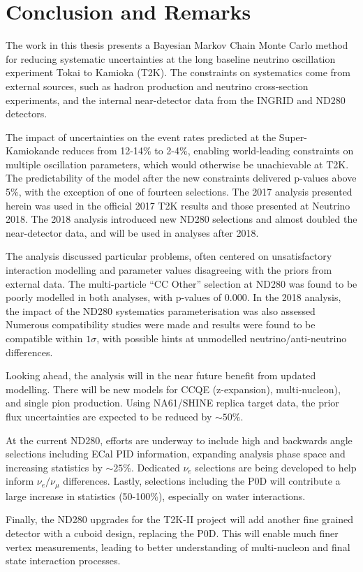 \chapter{Conclusion and Remarks}
\label{chap:conclusion}
The work in this thesis presents a Bayesian Markov Chain Monte Carlo method for reducing systematic uncertainties at the long baseline neutrino oscillation experiment Tokai to Kamioka (T2K). The constraints on systematics come from external sources, such as hadron production and neutrino cross-section experiments, and the internal near-detector data from the INGRID and ND280 detectors.

The impact of uncertainties on the event rates predicted at the Super-Kamiokande reduces from 12-14\% to 2-4\%, enabling world-leading constraints on multiple oscillation parameters, which would otherwise be unachievable at T2K. The predictability of the model after the new constraints delivered p-values above 5\%, with the exception of one of fourteen selections. The 2017 analysis presented herein was used in the official 2017 T2K results and those presented at Neutrino 2018. The 2018 analysis introduced new ND280 selections and almost doubled the near-detector data, and will be used in analyses after 2018.

The analysis discussed particular problems, often centered on unsatisfactory interaction modelling and parameter values disagreeing with the priors from external data. The multi-particle ``CC Other'' selection at ND280 was found to be poorly modelled in both analyses, with p-values of 0.000. In the 2018 analysis, the impact of the ND280 systematics parameterisation was also assessed Numerous compatibility studies were made and results were found to be compatible within $1\sigma$, with possible hints at unmodelled neutrino/anti-neutrino differences.

Looking ahead, the analysis will in the near future benefit from updated modelling. There will be new models for CCQE (z-expansion\cite{z-exp}), multi-nucleon\cite{nieves1}), and single pion production\cite{thesis_minoo}. Using NA61/SHINE replica target data, the prior flux uncertainties are expected to be reduced by $\sim50\%$\cite{flux_red}.

At the current ND280, efforts are underway to include high and backwards angle selections including ECal PID information, expanding analysis phase space and increasing statistics by $\sim25\%$. Dedicated $\nu_e$ selections are being developed to help inform $\nu_e/\nu_\mu$ differences. Lastly, selections including the P0D will contribute a large increase in statistics (50-100\%), especially on water interactions.

Finally, the ND280 upgrades\cite{t2k_upgrades} for the T2K-II project\cite{t2k_ii} will add another fine grained detector with a cuboid design, replacing the P0D. This will enable much finer vertex measurements, leading to better understanding of multi-nucleon and final state interaction processes.